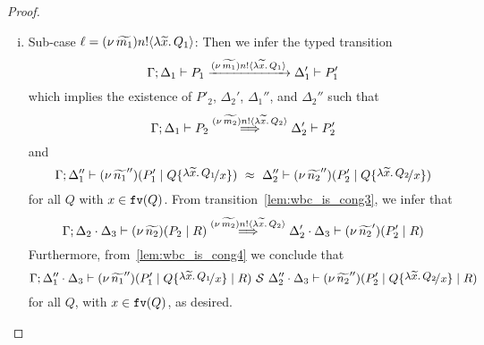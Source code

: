 \begin{proof}
\begin{enumerate}[I.]
\begin{enumerate}[1.]
\begin{enumerate}[i.]
					\item	Sub-case $\ell = (\nu\, \widetilde{m_1}) n ! \langle \lambda \widetilde{x}.\,Q_1 \rangle$:
					Then we infer the typed transition 
							\[
								\Gamma; \Delta_1 \vdash P_1 \xrightarrow{(\nu\, \widetilde{m_1}) n ! \langle \lambda \widetilde{x}.\,Q_1 \rangle} \Delta_1' \vdash P_1'
							\]
							which implies the existence of $P'_2$, $\Delta_2'$, $\Delta_1''$, and $\Delta_2''$ such that 
							\begin{equation}
								 \Gamma; \Delta_1 \vdash P_2 \stackrel{(\nu\, \widetilde{m_2}) n ! \langle \lambda \widetilde{x}.\,Q_2 \rangle}{\Longrightarrow} \Delta_2' \vdash P_2'
								\label{lem:wbc_is_cong3}
								\end{equation}
								and 
						\begin{equation}
								  \horel{\Gamma}{\Delta_1''}{\newsp{\widetilde{n_1}''}{P_1' \Par Q \subst{\abs{\widetilde{x}}{Q_1}}{x}}}
								{\ \wbc\ }
								{\Delta_2''}{\newsp{\widetilde{n_2}''}{P_2' \Par Q \subst{\abs{\widetilde{x}}{Q_2}}{x}}}
								\label{lem:wbc_is_cong4}
							\end{equation}
					for all $Q$ with  $x \in \mathtt{fv}(Q)$.  From transition~\eqref{lem:wbc_is_cong3}, we infer that 
							\[
								\Gamma; \Delta_2 \cdot \Delta_3 \vdash (\nu\, \widetilde{n_2})(P_2 \;|\; R) \stackrel{(\nu\, \widetilde{m_2}) n ! \langle \lambda \widetilde{x}.\,Q_2 \rangle}{\Longrightarrow} \Delta_2' \cdot \Delta_3 \vdash (\nu\, \widetilde{n_2}')(P_2' \;|\; R)
							\]
				 Furthermore, from~\eqref{lem:wbc_is_cong4} we conclude that 
							\[
								\horel{\Gamma}{\Delta_1'' \cat \Delta_3}{\newsp{\widetilde{n_1}''}{P_1' \Par Q \subst{\abs{\widetilde{x}}{ Q_1}}{x} \Par R}}
								{\ \mathcal{S}\ }
								{\Delta_2'' \cat \Delta_3}{\newsp{\widetilde{n_2}''}{P_2' \Par Q \subst{\abs{\widetilde{x}}{Q_2}}{x} \Par R}}
							\]
				for all $Q$, with  $x \in \mathtt{fv}(Q)$, as desired. \\


\end{enumerate}
\end{enumerate}
\end{enumerate}
\end{proof}
